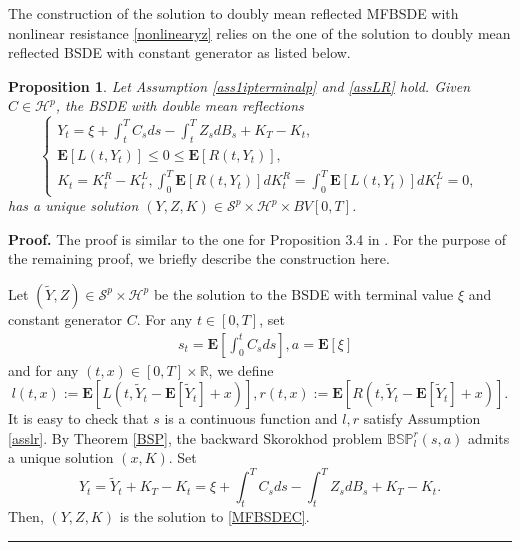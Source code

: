 \documentclass[10pt]{article}%
\numberwithin{equation}{section}
\newtheorem{proposition}[theorem]{Proposition}
\newenvironment{proof}[1][Proof]{\noindent \textbf{#1.} }{\  \rule{0.5em}{0.5em}}
\def \E{\mathbf{E}}
\begin{document}
The construction of the solution to doubly mean reflected MFBSDE with nonlinear resistance \eqref{nonlinearyz} relies on the one of the solution to doubly mean reflected BSDE with constant generator as listed below. %
\begin{proposition}\label{pro-1}
  Let  Assumption \ref{ass1ipterminalp} and \ref{assLR} hold. Given $C\in \mathcal{H}^p$, the BSDE with double mean reflections 
   \begin{equation}\label{MFBSDEC}
   \begin{cases}
Y_t=\xi+\int_t^T C_s ds-\int_t^T Z_s dB_s+K_T-K_t, \\
\E[L(t,Y_t)]\leq 0\leq \E[R(t,Y_t)], \\
K_t=K^{R}_t-K^{L}_t, \int_0^T \E[R(t,Y_t)]dK_t^{R}=\int_0^T \E[L(t,Y_t)]dK^{L}_t=0,
\end{cases}
\end{equation}
has a unique solution $\left(Y,Z,K\right)\in \mathcal{S}^p\times\mathcal{H}^{p}\times BV[0,T]$.
\end{proposition}
\begin{proof}
 The proof is similar to the one for Proposition 3.4 in \cite{LS}. For the purpose of the remaining proof, we briefly describe the construction here.
 
Let $(\tilde{Y},Z)\in \mathcal{S}^p\times \mathcal{H}^p$ be the solution to the BSDE with terminal value $\xi$ and constant generator $C$. For any $t\in[0,T]$, set 
 $$\begin{aligned}
  & s_t=\E\left[\int_{0}^{t}C_s ds\right], a=\E\left[\xi\right]
 \end{aligned}$$
and for any $(t,x)\in[0,T]\times \mathbb{R}$, we define 
$$l(t,x):=\E\left[L\left(t,\tilde{Y}_t-\E[\tilde{Y}_t]+x\right)\right],r(t,x):=\E\left[R\left(t,\tilde{Y}_t-\E[\tilde{Y}_t]+x\right)\right].$$
It is easy to check that $s$ is a continuous function  and $l,r$ satisfy Assumption \ref{asslr}. By Theorem \ref{BSP}, the backward Skorokhod problem $\mathbb{BSP}_l^r(s,a)$ admits a unique solution $(x,K)$. Set$$Y_t=\tilde{Y}_t+K_T-K_t=\xi+\int_{t}^{T}C_s ds-\int_{t}^{T}Z_s d B_s+K_T-K_t.$$ 
Then, $(Y,Z,K)$ is the solution to \eqref{MFBSDEC}.
\end{proof}
\end{document}
